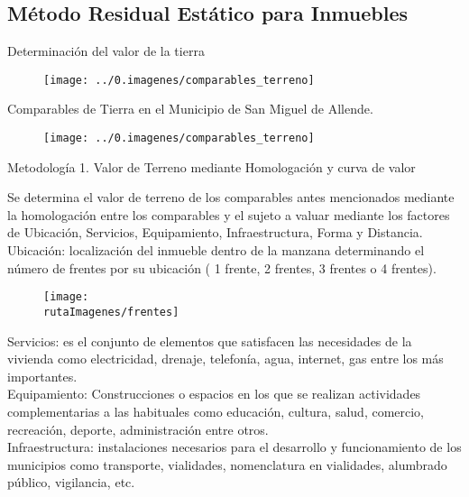 \subsection{Método Residual Estático para Inmuebles}

\textcolor{principal}{Determinaci\'on del valor de la tierra}

\begin{figure}[H]
	\texttt{[image: ../0.imagenes/comparables\_terreno]}
\end{figure}

\textcolor{principal}{Comparables de Tierra en el Municipio de San Miguel de Allende.}

\begin{figure}[H]
	\texttt{[image: ../0.imagenes/comparables\_terreno]}
\end{figure}

\textcolor{principal}{Metodolog\'ia 1. Valor de Terreno mediante Homologaci\'on y curva de valor}

Se determina el valor de terreno de los comparables antes mencionados mediante la homologaci\'on entre los comparables y el sujeto a valuar mediante los factores de Ubicaci\'on, Servicios, Equipamiento, Infraestructura, Forma y Distancia.\\

Ubicaci\'on: localizaci\'on del inmueble dentro de la manzana determinando el n\'umero de frentes por su ubicaci\'on ( 1 frente, 2 frentes, 3 frentes o 4 frentes).

\begin{figure}[H]
	\texttt{[image: \\rutaImagenes/frentes]}
\end{figure}

\textcolor{principal}{Servicios:} es el conjunto de elementos que satisfacen las necesidades de  la vivienda  como electricidad, drenaje, telefon\'ia, agua, internet, gas entre los m\'as importantes.\\

\textcolor{principal}{Equipamiento}: Construcciones o espacios en los que se realizan actividades complementarias a las habituales como educaci\'on, cultura, salud, comercio, recreaci\'on, deporte, administraci\'on entre otros.\\

\textcolor{principal}{Infraestructura:} instalaciones necesarios para el desarrollo y funcionamiento de los municipios como transporte, vialidades, nomenclatura en  vialidades, alumbrado p\'ublico, vigilancia, etc.\\


